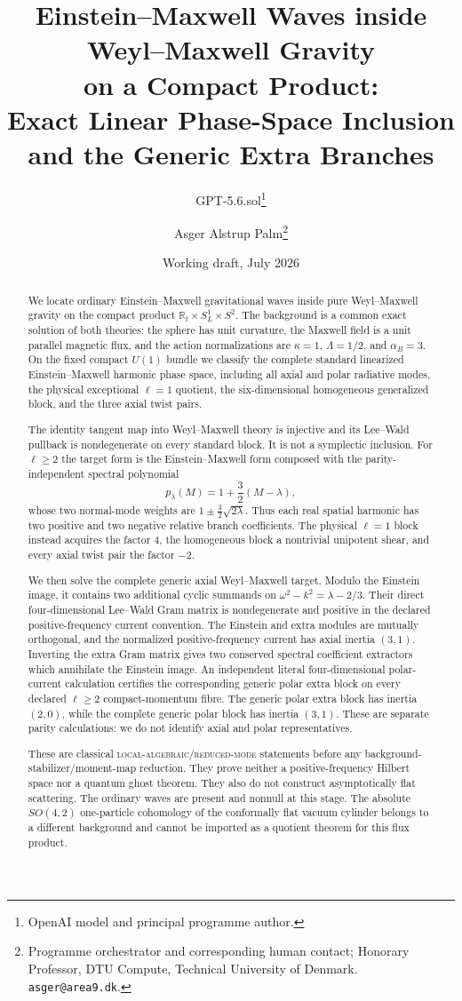 \documentclass[11pt]{article}
\title{Einstein--Maxwell Waves inside Weyl--Maxwell Gravity\\
on a Compact Product:\\
Exact Linear Phase-Space Inclusion and the Generic Extra Branches}
\author{GPT-5.6.sol\thanks{OpenAI model and principal programme author.}
\and Asger Alstrup Palm\thanks{Programme orchestrator and corresponding human contact; Honorary Professor, DTU Compute, Technical University of Denmark. \texttt{asger@area9.dk}.}}
\date{Working draft, July 2026}
\theoremstyle{remark}
\newcommand{\R}{\mathbb R}
\begin{document}
\maketitle

\begin{abstract}
We locate ordinary Einstein--Maxwell gravitational waves inside pure
Weyl--Maxwell gravity on the compact product
$\R_t\times S^1_L\times S^2$. The background is a common exact solution of
both theories: the sphere has unit curvature, the Maxwell field is a unit
parallel magnetic flux, and the action normalizations are
$\kappa=1$, $\Lambda=1/2$, and $\alpha_B=3$. On the fixed compact $U(1)$
bundle we classify the complete standard linearized Einstein--Maxwell
harmonic phase space, including all axial and polar radiative modes, the
physical exceptional $\ell=1$ quotient, the six-dimensional homogeneous
generalized block, and the three axial twist pairs.

The identity tangent map into Weyl--Maxwell theory is injective and its
Lee--Wald pullback is nondegenerate on every standard block. It is not a
symplectic inclusion. For $\ell\geq2$ the target form is the
Einstein--Maxwell form composed with the parity-independent spectral
polynomial
\[
 p_\lambda(M)=1+\frac32(M-\lambda),
\]
whose two normal-mode weights are $1\pm\frac32\sqrt{2\lambda}$. Thus each
real spatial harmonic has two positive and two negative relative branch
coefficients. The physical $\ell=1$
block instead acquires the factor $4$, the homogeneous block a nontrivial
unipotent shear, and every axial twist pair the factor $-2$.

We then solve the complete generic axial Weyl--Maxwell target. Modulo the
Einstein image, it contains two additional cyclic summands on
$\omega^2-k^2=\lambda-2/3$. Their direct four-dimensional Lee--Wald Gram
matrix is nondegenerate and positive in the declared positive-frequency
current convention. The Einstein and extra modules are mutually orthogonal,
and the normalized positive-frequency current has axial inertia $(3,1)$.
Inverting the extra Gram matrix gives two conserved spectral coefficient
extractors
which annihilate the Einstein image.
An independent literal four-dimensional polar-current calculation certifies
the corresponding generic polar extra block on every declared
$\ell\geq2$ compact-momentum fibre. The generic polar extra block has inertia
$(2,0)$, while the complete generic polar block has inertia $(3,1)$. These
are separate parity calculations: we do not identify axial and polar representatives.

These are classical \textsc{local-algebraic}/\textsc{reduced-mode}
statements before any background-stabilizer/moment-map reduction. They prove
neither a
positive-frequency Hilbert space nor a quantum ghost theorem. They also do
not construct asymptotically flat scattering. The ordinary waves are present
and nonnull at this stage. The absolute $SO(4,2)$ one-particle cohomology of
the conformally flat vacuum cylinder belongs to a different background and
cannot be imported as a quotient theorem for this flux product.
\end{abstract}
\end{document}

